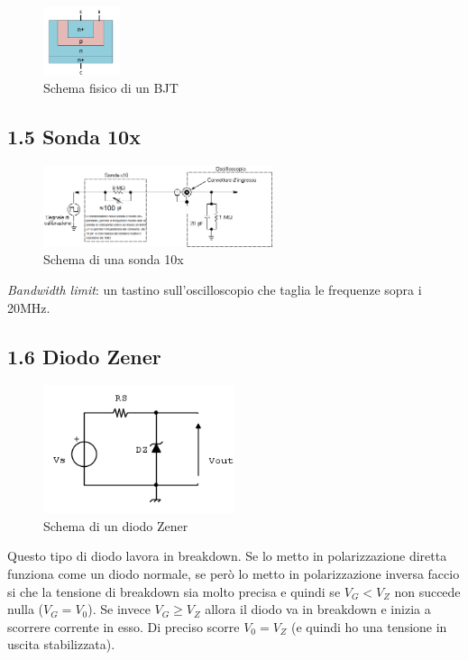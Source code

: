 \documentclass[
]{article}
\begin{document}
\begin{figure}
\centering
\includegraphics[width=0.2\textwidth,height=\textheight]{immagini/9.png}
\caption{Schema fisico di un BJT}
\end{figure}

\subsection{1.5 Sonda 10x}\label{sonda-10x}

\begin{figure}
\centering
\includegraphics[width=0.6\textwidth,height=\textheight]{immagini/10.png}
\caption{Schema di una sonda 10x}
\end{figure}

\emph{Bandwidth limit}: un tastino sull'oscilloscopio che taglia le
frequenze sopra i 20MHz.\newpage

\subsection{1.6 Diodo Zener}\label{diodo-zener}

\begin{figure}
\centering
\includegraphics[width=0.5\textwidth,height=\textheight]{immagini/11.png}
\caption{Schema di un diodo Zener}
\end{figure}

Questo tipo di diodo lavora in breakdown. Se lo metto in polarizzazione
diretta funziona come un diodo normale, se però lo metto in
polarizzazione inversa faccio si che la tensione di breakdown sia molto
precisa e quindi se \(V_{G}<V_{Z}\) non succede nulla (\(V_{G}=V_{0}\)).
Se invece \(V_{G}\geq V_{Z}\) allora il diodo va in breakdown e inizia a
scorrere corrente in esso. Di preciso scorre \(V_{0}=V_{Z}\) (e quindi
ho una tensione in uscita stabilizzata).
\end{document}
